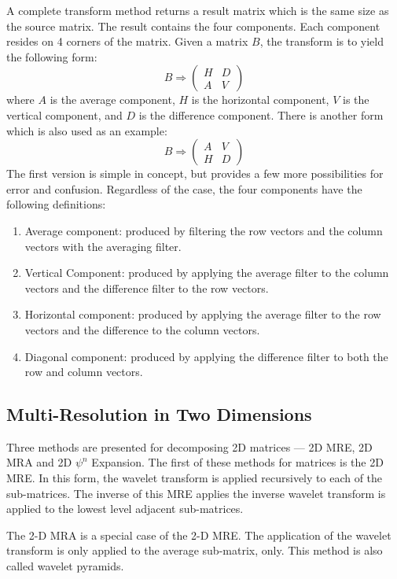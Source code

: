 A complete transform method returns a result matrix which is the same
size as the source matrix. The result contains the four
components. Each component resides on 4 corners of the matrix. Given a
matrix $B$, the transform is to yield the following form:
\[ 
B \Rightarrow 
\left(
\begin{array}{cc}
H & D \\ 
A & V
\end{array}
\right)
\]
where $A$ is the average component, $H$ is the horizontal component,
$V$ is the vertical component, and $D$ is the difference
component. There is another form which is also used as an example:
\[
B \Rightarrow 
\left(
\begin{array}{cc}
A & V \\ 
H & D
\end{array}
\right)
\]
The first version is simple in concept, but provides a few more
possibilities for error and confusion.  Regardless of the case, the
four components have the following definitions:
\begin{enumerate}
\item Average component: produced by filtering the row vectors and the column vectors with the averaging filter.
\item Vertical Component:  produced by applying the average filter to the column vectors and the difference filter to the row vectors.
\item Horizontal component: produced by applying the average filter to the row vectors and the difference to the column vectors.
\item Diagonal component: produced by applying the difference filter to both the row and column vectors.  
\end{enumerate}

\subsection {Multi-Resolution in Two Dimensions} 

Three methods are presented for decomposing 2D matrices --- 2D MRE, 2D
MRA and 2D $\psi^n$ Expansion. The first of these methods for matrices
is the 2D MRE.  In this form, the wavelet transform is applied
recursively to each of the sub-matrices.  The inverse of this MRE
applies the inverse wavelet transform is applied to the lowest level
adjacent sub-matrices.

The 2-D MRA is a special case of the 2-D MRE.  The application of the
wavelet transform is only applied to the average sub-matrix, only.
This method is also called wavelet pyramids.

